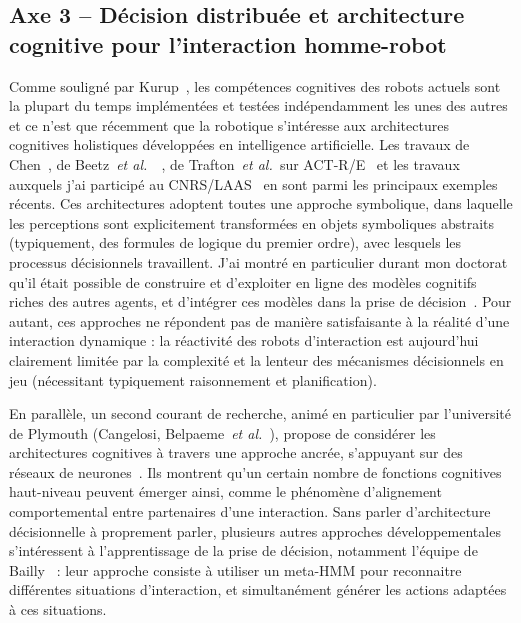 \documentclass[a4paper]{article}
\newcommand{\etal}{{\textit{et al.~}}}
\begin{document}
\subsection*{Axe 3 -- Décision distribuée et architecture cognitive pour l'interaction homme-robot}

Comme souligné par Kurup~\cite{kurup2012what}, les compétences cognitives des
robots actuels sont la plupart du temps implémentées et testées indépendamment
les unes des autres et ce n'est que récemment que la robotique s'intéresse aux
architectures cognitives holistiques développées en intelligence artificielle.
Les travaux de Chen~\cite{Chen2010}, de Beetz~\etal~\cite{Beetz2010}, de
Trafton~\etal sur ACT-R/E~\cite{trafton2013act} et les travaux auxquels j'ai
participé au CNRS/LAAS~\cite{lemaignan2015human} en sont parmi les principaux
exemples récents. Ces architectures adoptent toutes une approche symbolique,
dans laquelle les perceptions sont explicitement transformées en objets
symboliques abstraits (typiquement, des formules de logique du premier ordre),
avec lesquels les processus décisionnels travaillent. J'ai montré en particulier
durant mon doctorat qu'il était possible de construire et d'exploiter en ligne
des modèles cognitifs riches des autres agents, et d'intégrer ces modèles dans
la prise de décision~\cite{alami2011when, warnier2012when, lemaignan2015human}.
Pour autant, ces approches ne répondent pas de manière satisfaisante à la
réalité d'une interaction dynamique : la réactivité des robots d'interaction est
aujourd'hui clairement limitée par la complexité et la lenteur des mécanismes
décisionnels en jeu (nécessitant typiquement raisonnement et planification).

En parallèle, un second courant de recherche, animé en particulier par
l'université de Plymouth (Cangelosi, Belpaeme~\etal), propose de considérer les
architectures cognitives à travers une approche
ancrée, s'appuyant sur des réseaux de neurones~\cite{morse2010epigenetic,
baxter2013cognitive}. Ils montrent qu'un certain nombre de fonctions cognitives
haut-niveau peuvent émerger ainsi, comme le phénomène d'alignement
comportemental entre partenaires d'une interaction.
Sans parler d'architecture décisionnelle à proprement parler, plusieurs autres
approches développementales s'intéressent à l'apprentissage de la prise de
décision, notamment l'équipe de Bailly~\cite{mihoub2014modeling} : leur approche
consiste à utiliser un meta-HMM pour reconnaitre différentes situations
d'interaction, et simultanément générer les actions adaptées à ces situations.
\end{document}

